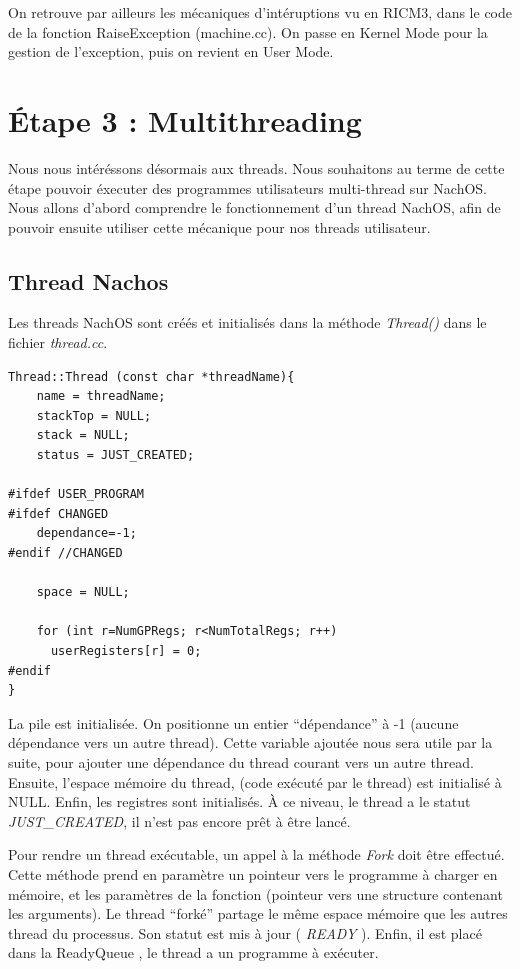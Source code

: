 \documentclass[a4paper,10pt]{article}
\begin{document}
On retrouve par ailleurs les mécaniques d'intéruptions vu en RICM3, dans le code de la fonction RaiseException (machine.cc).
On passe en Kernel Mode pour la gestion de l'exception, puis on revient en User Mode.


\newpage
\section{Étape 3 : Multithreading}
Nous nous intéréssons désormais aux threads. Nous souhaitons au terme de cette étape pouvoir éxecuter des programmes utilisateurs multi-thread
sur NachOS. Nous allons d'abord comprendre le fonctionnement d'un thread NachOS, afin de pouvoir ensuite utiliser cette mécanique pour nos threads utilisateur.

\subsection{Thread Nachos}
Les threads NachOS sont créés et initialisés dans la méthode \textit{Thread()} dans le fichier \textit{thread.cc}.
\begin{lstlisting}[frame=single]
 Thread::Thread (const char *threadName){
    name = threadName;
    stackTop = NULL;
    stack = NULL;
    status = JUST_CREATED;

#ifdef USER_PROGRAM
#ifdef CHANGED
    dependance=-1;
#endif //CHANGED

    space = NULL;

    for (int r=NumGPRegs; r<NumTotalRegs; r++)
      userRegisters[r] = 0;
#endif
}
\end{lstlisting}
La pile est initialisée. On positionne un entier ``dépendance'' à -1 (aucune dépendance vers un autre thread). Cette variable ajoutée nous sera utile par la suite,
pour ajouter une dépendance du thread courant vers un autre thread. Ensuite, l'espace mémoire du thread, (code exécuté par le thread) est initialisé à NULL. Enfin,
les registres sont initialisés. À ce niveau, le thread a le statut \textit{JUST\_CREATED}, il n'est pas encore prêt à être lancé.

\vspace{0.5cm}

Pour rendre un thread exécutable, un appel à la méthode \textit{Fork} doit être effectué. Cette méthode prend en paramètre un pointeur vers le programme à charger en mémoire, et
les paramètres de la fonction (pointeur vers une structure contenant les arguments). Le thread ``forké'' partage le même espace mémoire que les autres thread du processus.
Son statut est mis à jour ( \textit{READY} ). Enfin, il est placé dans la ReadyQueue , le thread a un programme à exécuter.
\end{document}
